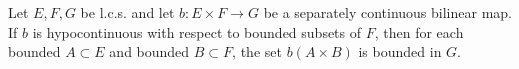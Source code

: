 Let $E, F, G$ be l.c.s. and let $b: E \times F \rightarrow G$ be a separately continuous bilinear map. If $b$ is hypocontinuous with respect to bounded subsets of $F$, then for each bounded $A \subset E$ and bounded $B \subset F$, the set $b(A \times B)$ is bounded in $G$.
